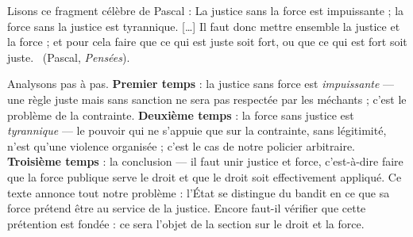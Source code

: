 \documentclass[11pt]{article}
\begin{document}
\begin{experience}
Lisons ce fragment célèbre de Pascal : \guillemotleft La justice sans la force est impuissante ; la force sans la justice est tyrannique. [\dots] Il faut donc mettre ensemble la justice et la force ; et pour cela faire que ce qui est juste soit fort, ou que ce qui est fort soit juste. \guillemotright\ (Pascal, \emph{Pensées}).

Analysons pas à pas. \textbf{Premier temps} : la justice sans force est \emph{impuissante} — une règle juste mais sans sanction ne sera pas respectée par les méchants ; c'est le problème de la contrainte. \textbf{Deuxième temps} : la force sans justice est \emph{tyrannique} — le pouvoir qui ne s'appuie que sur la contrainte, sans légitimité, n'est qu'une violence organisée ; c'est le cas de notre policier arbitraire. \textbf{Troisième temps} : la conclusion — il faut unir justice et force, c'est-à-dire faire que la force publique serve le droit et que le droit soit effectivement appliqué. Ce texte annonce tout notre problème : l'État se distingue du bandit en ce que sa force prétend être au service de la justice. Encore faut-il vérifier que cette prétention est fondée : ce sera l'objet de la section sur le droit et la force.
\end{experience}
\end{document}
